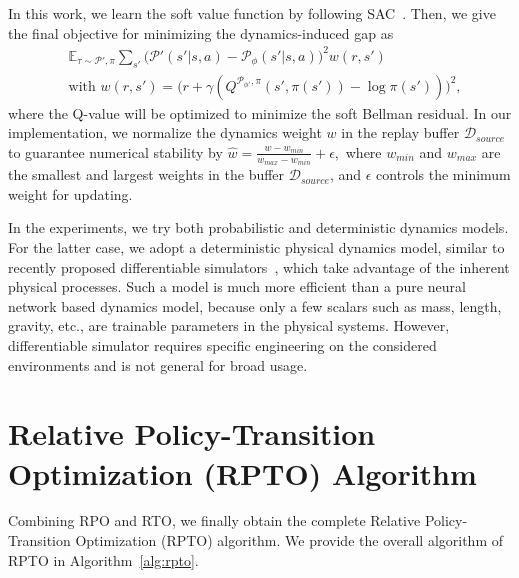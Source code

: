 \documentclass[letterpaper]{article} %
\def\E{{\mathbb{E}}}
\def\P{{\mathcal{P}}}
\begin{document}
In this work, we learn the soft value function by following SAC~\cite{haarnoja2018soft}.
Then, we give the final objective for minimizing the dynamics-induced gap as
{\small
\begin{equation}
\begin{aligned}
&\E_{\tau \sim \P',\pi}
\sum_{s'}
\big( \P'(s'|s,a)- \P_{\phi}(s'|s,a)\big)^2 w(r, s')
\\
&\text{with }w(r, s') = \big(
r+\gamma (Q^{\P_{\phi'},\pi}(s', \pi(s')) - \log \pi(s') )
\big)^2,
\end{aligned}
\label{eq:rto_p2}
\end{equation}
}where the Q-value will be optimized to minimize the soft Bellman residual.
In our implementation, we normalize the dynamics weight $w$ in the replay buffer $\mathcal{D}_{source}$ to guarantee numerical stability by
    $\hat{w} = \frac{w - w_{min} }{w_{max} - w_{min}} + \epsilon,$
where $w_{min}$ and $w_{max}$ are the smallest and largest weights in the buffer $\mathcal{D}_{source}$,
and $\epsilon$ controls the minimum weight for updating.

In the experiments, we try both probabilistic and deterministic dynamics models. For the latter case, we adopt a deterministic physical dynamics model, similar to recently proposed differentiable  simulators~\citep{hu2020difftaichi,brax2021github,werling2021fast}, which take advantage of the inherent physical processes. Such a model is much more efficient than a pure neural network based dynamics model, because only a few scalars
such as mass, length, gravity, etc.,
are trainable parameters in the physical systems. However, differentiable  simulator requires specific engineering on the considered environments and is not general for broad usage.



\section{Relative Policy-Transition Optimization (RPTO) Algorithm}
\label{sec:rpto}
Combining RPO and RTO, we finally obtain the complete Relative Policy-Transition Optimization (RPTO) algorithm.
We provide the overall algorithm of RPTO in Algorithm~\ref{alg:rpto}.
\end{document}
